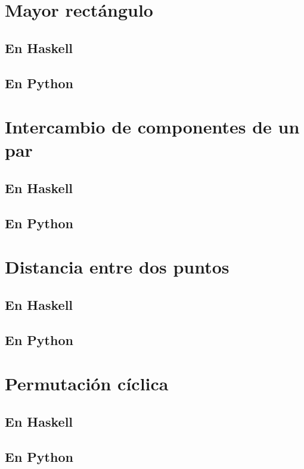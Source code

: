 \documentclass[a4paper,12pt,twoside]{book}
\begin{document}
\section{Mayor rectángulo}
\subsection*{En Haskell}
\subsection*{En Python}

\section{Intercambio de componentes de un par}
\subsection*{En Haskell}
\subsection*{En Python}

\section{Distancia entre dos puntos}
\subsection*{En Haskell}
\subsection*{En Python}

\section{Permutación cíclica}
\subsection*{En Haskell}
\subsection*{En Python}
\end{document}

